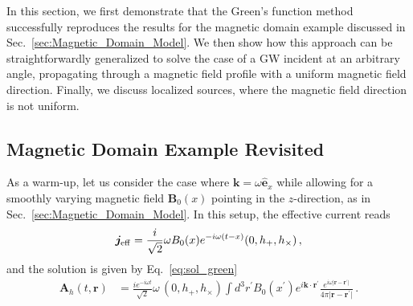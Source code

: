 \documentclass[a4paper,11pt]{article}
\begin{document}
In this section, we first demonstrate that the Green's function method successfully reproduces the results for the magnetic domain example discussed in Sec.~\ref{sec:Magnetic_Domain_Model}.
%
We then show how this approach can be straightforwardly generalized to solve the case of a GW incident at an arbitrary angle, propagating through a magnetic field profile with a uniform magnetic field direction. 
%
Finally, we discuss localized sources, where the magnetic field direction is not uniform.






\subsection{Magnetic Domain Example Revisited}
\label{sec:magnetic_domains_2}

%
As a warm-up, let us consider the case where $ \bm{k} = \omega \hat{\bm e}_{x} $ while allowing for a smoothly varying magnetic field $ \bm{B}_{0}(x) $ pointing in the $z$-direction, as in Sec.~\ref{sec:Magnetic_Domain_Model}.
%
In this setup, the effective current reads
\begin{align}
     \bm{j}_{\rm eff}  =  \frac{i}{\sqrt{2}} \omega B_{0}(x)  e^{- i \omega (t - x)} ( 0, h_{+}, h_{\times}) \,,
     \label{eq:effective_current_mag_domain}
\end{align}
and the solution is given by Eq.~\eqref{eq:sol_green}
\begin{align}
     \bm{A}_{h}(t, \bm r)
     & =  \frac{i e^{- i \omega t}}{ \sqrt{2}  }  \omega \,( 0, h_{+}, h_{\times})   \int d^{3} r^{\prime}   B_{0}  (x^{\prime}) e^{i \bm{k} \cdot \bm{r}^{\prime} }  \frac{e^{i \omega \vert \bm{r} - \bm{r}^{\prime} \vert} }{ 4 \pi \vert \bm{r} - \bm{r}^{\prime} \vert } \,.
     \label{eq:MD_Greens_1}
\end{align}
\end{document}
